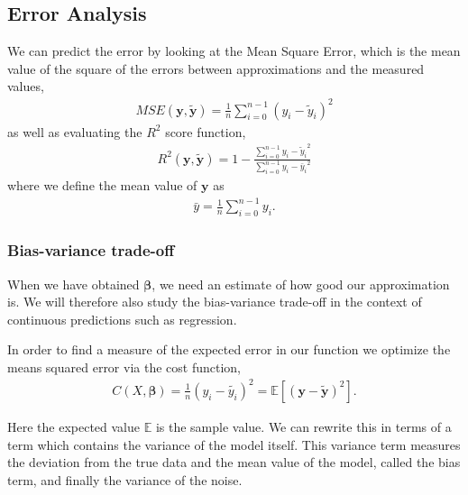 \documentclass[reprint,english,notitlepage]{revtex4-1}  %
\begin{document}
\subsection*{Error Analysis}
We can predict the error by looking at the Mean Square Error, which is the mean value of the square of the errors between approximations and the measured values, 
\begin{align}\label{eq: MSE}
    MSE\left(\boldsymbol{y},\boldsymbol{\tilde{y}}\right) = \frac{1}{n}\sum\limits_{i=0}^{n-1}{\left(y_i - \tilde{y}_i\right)}^2
\end{align}
as well as evaluating the $R^2$ score function, 
\begin{align}\label{eq: R2}
    R^2 \left(\boldsymbol{y},\boldsymbol{\tilde{y}}\right) = 1 - \frac
    {\sum\limits_{i=0}^{n-1}{y_i - \tilde{y}_i}^2}
    {\sum\limits_{i=0}^{n-1}{y_i - \bar{y}_i}^2}
\end{align}
where we define the mean value of $\boldsymbol{y}$ as 
\begin{align}\label{eq: mean_y}
    \bar{y} = \frac{1}{n}\sum_{i=0}^{n-1} y_i. 
\end{align}


\subsubsection*{Bias-variance trade-off}
When we have obtained $\boldsymbol{\beta}$, we need an estimate of how good our approximation is. We will therefore also study the bias-variance trade-off in the context of continuous predictions such as regression. 

In order to find a measure of the expected error in our function we optimize the means squared error via the cost function, 
\begin{align}\label{eq: Cost Function}
    C(X, \boldsymbol{\beta}) = \frac{1}{n}(y_i - \tilde{y_i})^2 = \mathbb{E}\left[(\boldsymbol{y}  -\boldsymbol{\tilde{y}})^2\right]. 
\end{align}

Here the expected value $\mathbb{E}$ is the sample value. 
We can rewrite this in terms of a term which contains the variance of the model itself. This variance term measures the deviation from the true data and the mean value of the model, called the bias term, and finally the variance of the noise. 
\end{document}
